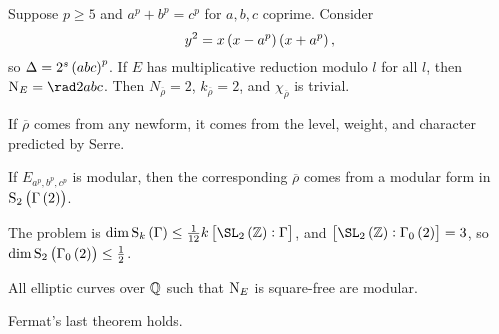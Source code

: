 \begin{theorem}[Frey 1985]
Suppose $ p \ge 5 $ and $ a^p + b^p = c^p $ for $ a, b, c $ coprime. Consider
$$ y^2 = x\br{x - a^p}\br{x + a^p}, $$
so $ \Delta = 2^s\br{abc}^p $. If $ E $ has multiplicative reduction modulo $ l $ for all $ l $, then $ \N_E = \rad 2abc $. Then $ N_{\overline{\rho}} = 2 $, $ k_{\overline{\rho}} = 2 $, and $ \chi_{\overline{\rho}} $ is trivial.
\end{theorem}

\begin{theorem}[Ribet 1986]
If $ \overline{\rho} $ comes from any newform, it comes from the level, weight, and character predicted by Serre.
\end{theorem}

\begin{corollary}
If $ E_{a^p, b^p, c^p} $ is modular, then the corresponding $ \overline{\rho} $ comes from a modular form in $ \S_2\br{\Gamma\br{2}} $.
\end{corollary}

The problem is $ \dim \S_k\br{\Gamma} \le \tfrac{1}{12}k\sbr{\SL_2\br{\ZZ} : \Gamma} $, and $ \sbr{\SL_2\br{\ZZ} : \Gamma_0\br{2}} = 3 $, so $ \dim \S_2\br{\Gamma_0\br{2}} \le \tfrac{1}{2} $.

\begin{theorem}
All elliptic curves over $ \mathbb{Q} $ such that $ \mathrm{N}_E $ is square-free are modular.
\end{theorem}

\begin{corollary}
Fermat's last theorem holds.
\end{corollary}

